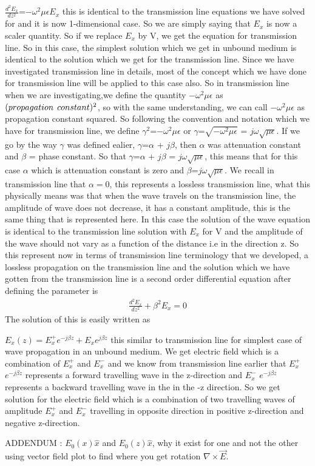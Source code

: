 $\frac{d^2 E_x}{d z^2}$=$-\omega^2\mu\epsilon E_{x}$ this is identical to the transmission line equations we have solved for and it is now 1-dimensional case. So we are simply saying that $E_x$ is now a scaler quantity. So if we replace  $E_x$ by V, we get the equation for transmission line. So in this case, the simplest solution which we get in unbound medium is identical to the solution which we get for the transmission line. Since we have investigated transmission line in details, most of the concept which we have done for transmission line will be applied to this case also. So in transmission line when we are investigating,we define the quantity $-\omega^2\mu\epsilon$ as $(propagation\hspace{0.15cm} constant)^2$,  so with the same understanding, we can call $-\omega^2\mu\epsilon$ as  propagation constant squared. So following the convention and notation which we have for transmission line, we define $\gamma^2$=$-\omega^2\mu\epsilon$ or $\gamma$=$\sqrt{-\omega^2\mu\epsilon}$ = $j\omega\sqrt{\mu\epsilon}$. If we go by the way $\gamma$ was defined ealier, $\gamma$=$\alpha$ + $j\beta$, then $\alpha$ was attenuation constant and $\beta$ = phase constant. So that  $\gamma$=$\alpha$ + $j\beta$ = $j\omega\sqrt{\mu\epsilon}$, this means that for this case $\alpha$ which is attenuation constant is zero and    $\beta$=$j\omega\sqrt{\mu\epsilon}$.
We recall in transmission line that $\alpha=0$, this represents a lossless transmission line, what this physically means was that  when the wave travels on the transmission line, the amplitude of wave does not decrease, it has a constant amplitude, this is the same thing that is represented here. In this case the solution of the wave equation is identical to the transmission line solution with $E_x$ for V and the amplitude of the wave should not vary as a function of the distance i.e in the direction z. So this represent now in terms of transmission line terminology that we developed, a lossless propagation on the transmission line and the solution which we have gotten from the transmission line is a second order differential equation after defining the parameter is
\begin{align}
\frac{d^2E_x}{dz^2}+\beta^2E_x=0
\end{align}
The solution of this is easily written as

$E_x(z)=E^+_xe^{-j\beta z}+E_xe^{j\beta z}$  this similar to transmission line for simplest case of wave propagation in an unbound medium.
We get electric field which is a combination of $E_x^+$ and  $E_x^-$ and we know from transmission line earlier that  $E_x^+$ $e^{-j\beta z}$ represents a forward travelling wave in the z-direction and  $E_x^-$ $e^{-j\beta z}$ represents a backward travelling wave in the in the -z direction. So we get solution for the electric field which is a combination of two travelling waves of amplitude $E_x^+$ and $E_x^-$ travelling in opposite direction in positive z-direction and negative z-direction.

ADDENDUM : $E_0(x)\hat{x}$ and $E_0(z)\hat{x}$, why it exist for one and not the other using vector field plot to find where you get rotation $\nabla\times\vec{E}$.